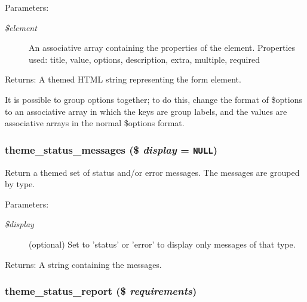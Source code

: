 \begin{Desc}
\item[Parameters:]
\begin{description}
\item[{\em \$element}]An associative array containing the properties of the element. Properties used: title, value, options, description, extra, multiple, required \end{description}
\end{Desc}
\begin{Desc}
\item[Returns:]A themed HTML string representing the form element.\end{Desc}
It is possible to group options together; to do this, change the format of \$options to an associative array in which the keys are group labels, and the values are associative arrays in the normal \$options format. \hypertarget{group__themeable_g45e373d20b2cbc62ecd05ae849a2b3bd}{
\subsubsection[{theme\_\-status\_\-messages}]{\setlength{\rightskip}{0pt plus 5cm}theme\_\-status\_\-messages (\$ {\em display} = {\tt NULL})}}
\label{group__themeable_g45e373d20b2cbc62ecd05ae849a2b3bd}


Return a themed set of status and/or error messages. The messages are grouped by type.

\begin{Desc}
\item[Parameters:]
\begin{description}
\item[{\em \$display}](optional) Set to 'status' or 'error' to display only messages of that type.\end{description}
\end{Desc}
\begin{Desc}
\item[Returns:]A string containing the messages. \end{Desc}
\hypertarget{group__themeable_g4ce2716a6dfd16ef7190bcbb797dd0eb}{
\subsubsection[{theme\_\-status\_\-report}]{\setlength{\rightskip}{0pt plus 5cm}theme\_\-status\_\-report (\$ {\em requirements})}}
\label{group__themeable_g4ce2716a6dfd16ef7190bcbb797dd0eb}


